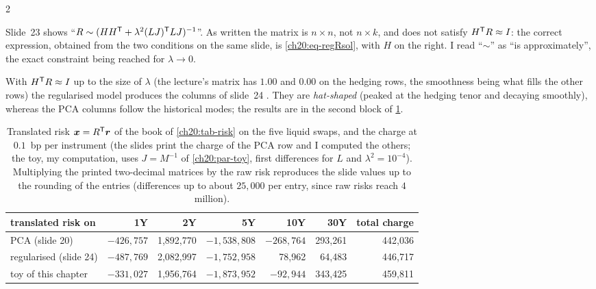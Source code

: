 \begin{paracol}{2}
\begin{coursenote}
Slide~23 shows ``$R\sim(HH^{\mathsf T}+\lambda^2(LJ)^{\mathsf T} LJ)^{-1}$''. As written the matrix is $n\times n$, not $n\times k$, and does not satisfy $H^{\mathsf T} R\approx I$: the correct expression, obtained from the two conditions on the same slide, is \eqref{ch20:eq-regRsol}, with $H$ on the right.
I read ``$\sim$'' as ``is approximately'', the exact constraint being reached for $\lambda\to0$.
\end{coursenote}

With $H^{\mathsf T} R\approx I$ up to the size of $\lambda$ (the lecture's matrix has $1.00$ and $0.00$ on the hedging rows, the smoothness being what fills the other rows) the regularised model produces the columns of slide~24 . They are
\emph{hat-shaped} (peaked at the hedging tenor and decaying smoothly), whereas the PCA columns follow the historical modes; the results are in the second block of \cref{ch20:tab-hedge}.

\begin{table}[ht]
\centering\footnotesize
\begin{tabular}{lrrrrrr}
\toprule
translated risk on & 1Y & 2Y & 5Y & 10Y & 30Y & total charge\\
\midrule
PCA (slide 20) & $-426{,}757$ & 1,892,770 & $-1{,}538{,}808$ & $-268{,}764$ & 293,261 & 442,036\\
regularised (slide 24) & $-487{,}769$ & 2,082,997 & $-1{,}752{,}958$ & 78,962 & 64,483 & 446,717\\
toy of this chapter & $-331{,}027$ & 1,956,764 & $-1{,}873{,}952$ & $-92{,}944$ & 343,425 & 459,811\\
\bottomrule
\end{tabular}
\caption{Translated risk $\bm x=R^{\mathsf T}\bm r$ of the book of \cref{ch20:tab-risk} on the five liquid swaps, and the charge at $0.1$~bp per instrument (the slides print the charge of the PCA
row and I computed the others; the toy, my computation, uses $J=M^{-1}$ of \cref{ch20:par-toy}, first differences for $L$ and $\lambda^2=10^{-4}$). Multiplying the printed two-decimal matrices by the raw risk reproduces the slide values up to the rounding of the entries (differences up to about $25{,}000$ per entry, since raw risks reach $4$ million).}\label{ch20:tab-hedge}
\end{table}


\end{paracol}
